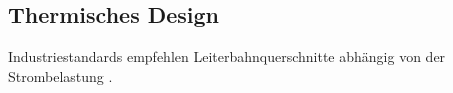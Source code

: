 \documentclass[10pt,a4paper,oneside,abstracton]{scrartcl}
\newenvironment{Figure}
  {\par\medskip\noindent\minipage{\linewidth}}
  {\endminipage\par\medskip}
\begin{document}
\begin{multicols}{2}



\section{Thermisches Design}
Industriestandards empfehlen Leiterbahnquerschnitte abhängig von der Strombelastung \cite{ipc}.
\newline

\end{multicols}
\end{document}
